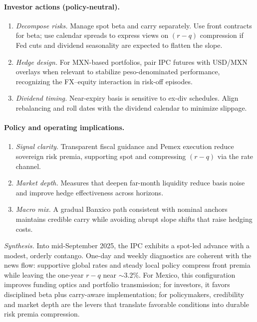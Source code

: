\documentclass[11pt,a4paper]{article} %
\begin{document}
\paragraph{Investor actions (policy-neutral).}
\begin{enumerate}
  \item \emph{Decompose risks.} Manage spot beta and carry separately. Use front contracts for beta; use calendar spreads to express views on \((r-q)\) compression if Fed cuts and dividend seasonality are expected to flatten the slope.
  \item \emph{Hedge design.} For MXN-based portfolios, pair IPC futures with USD/MXN overlays when relevant to stabilize peso-denominated performance, recognizing the FX–equity interaction in risk-off episodes.
  \item \emph{Dividend timing.} Near-expiry basis is sensitive to ex-div schedules. Align rebalancing and roll dates with the dividend calendar to minimize slippage.
\end{enumerate}

\paragraph{Policy and operating implications.}
\begin{enumerate}
  \item \emph{Signal clarity.} Transparent fiscal guidance and Pemex execution reduce sovereign risk premia, supporting spot and compressing \((r-q)\) via the rate channel.
  \item \emph{Market depth.} Measures that deepen far-month liquidity reduce basis noise and improve hedge effectiveness across horizons.
  \item \emph{Macro mix.} A gradual Banxico path consistent with nominal anchors maintains credible carry while avoiding abrupt slope shifts that raise hedging costs.
\end{enumerate}

\medskip
\noindent\emph{Synthesis.} Into mid-September 2025, the IPC exhibits a spot-led advance with a modest, orderly contango. One-day and weekly diagnostics are coherent with the news flow: supportive global rates and steady local policy compress front premia while leaving the one-year \(r-q\) near \(\sim 3.2\%\). For Mexico, this configuration improves funding optics and portfolio transmission; for investors, it favors disciplined beta plus carry-aware implementation; for policymakers, credibility and market depth are the levers that translate favorable conditions into durable risk premia compression.
\end{document}
